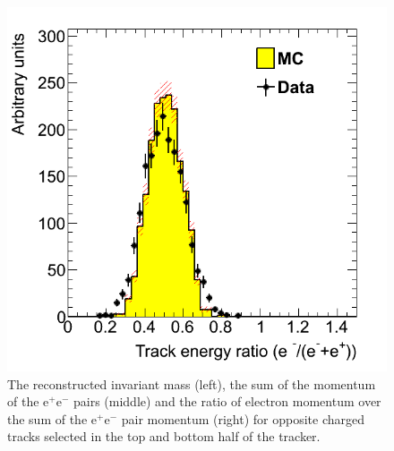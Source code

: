 \begin{figure}[ht]
   \includegraphics[scale=0.25]{test2012/vertexing/figures/h_ratioEsum_h_ratioEsum_dataMC_trigseltwotrksel4hit_recoilmc_twotrkfilt.png}
\caption{\small{The reconstructed invariant mass (left), the sum of the momentum of the  e$^+$e$^-$ pairs (middle) and the ratio of electron momentum over the sum of the e$^+$e$^-$ pair momentum (right) for opposite charged tracks selected in the top and bottom half of the tracker.}} 
\label{fig:pair_kin}
\end{figure}


